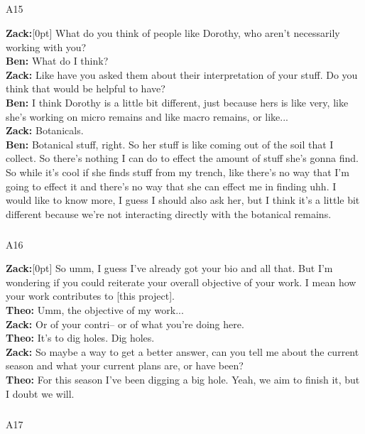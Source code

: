 \documentclass[
]{article}
\makeatletter
\let\oldsubparagraph\subparagraph
\renewcommand{\subparagraph}{
    \@ifstar
      \xxxSubParagraphStar
      \xxxSubParagraphNoStar
  }
\newcommand{\xxxSubParagraphStar}[1]{\oldsubparagraph*{#1}\mbox{}}
\newcommand{\xxxSubParagraphNoStar}[1]{\oldsubparagraph{#1}\mbox{}}
\newcommand{\paragraphnumber}[1]{\marginnote{\color{lightgray}\tiny{#1}}[0pt]}
\makeatother
\begin{document}
\subparagraph{A15}\label{sec-A15}

\textbf{Zack:}\paragraphnumber{[66]} What do you think of people like
Dorothy, who aren't necessarily working with you?\\
\textbf{Ben:} What do I think?\\
\textbf{Zack:} Like have you asked them about their interpretation of
your stuff. Do you think that would be helpful to have?\\
\textbf{Ben:} I think Dorothy is a little bit different, just because
hers is like very, like she's working on micro remains and like macro
remains, or like...\\
\textbf{Zack:} Botanicals.\\
\textbf{Ben:} Botanical stuff, right. So her stuff is like coming out of
the soil that I collect. So there's nothing I can do to effect the
amount of stuff she's gonna find. So while it's cool if she finds stuff
from my trench, like there's no way that I'm going to effect it and
there's no way that she can effect me in finding uhh. I would like to
know more, I guess I should also ask her, but I think it's a little bit
different because we're not interacting directly with the botanical
remains.

\subparagraph{A16}\label{sec-A16}

\textbf{Zack:}\paragraphnumber{[67]} So umm, I guess I've already got
your bio and all that. But I'm wondering if you could reiterate your
overall objective of your work. I mean how your work contributes to
{[}this project{]}.\\
\textbf{Theo:} Umm, the objective of my work...\\
\textbf{Zack:} Or of your contri-- or of what you're doing here.\\
\textbf{Theo:} It's to dig holes. Dig holes.\\
\textbf{Zack:} So maybe a way to get a better answer, can you tell me
about the current season and what your current plans are, or have
been?\\
\textbf{Theo:} For this season I've been digging a big hole. Yeah, we
aim to finish it, but I doubt we will.

\subparagraph{A17}\label{sec-A17}
\end{document}
